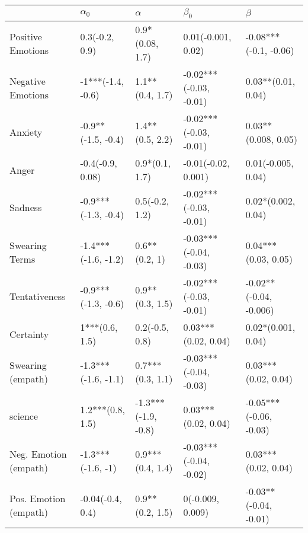 \begin{tabular}{lllll}
\toprule
{} &           $\alpha_0$ &             $\alpha$ &               $\beta_0$ &                 $\beta$ \\
\midrule
Positive Emotions     &       0.3(-0.2, 0.9) &      0.9*(0.08, 1.7) &      0.01(-0.001, 0.02) &   -0.08***(-0.1, -0.06) \\
Negative Emotions     &    -1***(-1.4, -0.6) &      1.1**(0.4, 1.7) &  -0.02***(-0.03, -0.01) &      0.03**(0.01, 0.04) \\
Anxiety               &   -0.9**(-1.5, -0.4) &      1.4**(0.5, 2.2) &  -0.02***(-0.03, -0.01) &     0.03**(0.008, 0.05) \\
Anger                 &     -0.4(-0.9, 0.08) &       0.9*(0.1, 1.7) &     -0.01(-0.02, 0.001) &      0.01(-0.005, 0.04) \\
Sadness               &  -0.9***(-1.3, -0.4) &       0.5(-0.2, 1.2) &  -0.02***(-0.03, -0.01) &      0.02*(0.002, 0.04) \\
Swearing Terms        &  -1.4***(-1.6, -1.2) &        0.6**(0.2, 1) &  -0.03***(-0.04, -0.03) &     0.04***(0.03, 0.05) \\
Tentativeness         &  -0.9***(-1.3, -0.6) &      0.9**(0.3, 1.5) &  -0.02***(-0.03, -0.01) &  -0.02**(-0.04, -0.006) \\
Certainty             &       1***(0.6, 1.5) &       0.2(-0.5, 0.8) &     0.03***(0.02, 0.04) &      0.02*(0.001, 0.04) \\
Swearing (empath)     &  -1.3***(-1.6, -1.1) &     0.7***(0.3, 1.1) &  -0.03***(-0.04, -0.03) &     0.03***(0.02, 0.04) \\
science               &     1.2***(0.8, 1.5) &  -1.3***(-1.9, -0.8) &     0.03***(0.02, 0.04) &  -0.05***(-0.06, -0.03) \\
Neg. Emotion (empath) &    -1.3***(-1.6, -1) &     0.9***(0.4, 1.4) &  -0.03***(-0.04, -0.02) &     0.03***(0.02, 0.04) \\
Pos. Emotion (empath) &     -0.04(-0.4, 0.4) &      0.9**(0.2, 1.5) &        0(-0.009, 0.009) &   -0.03**(-0.04, -0.01) \\
\bottomrule
\end{tabular}
